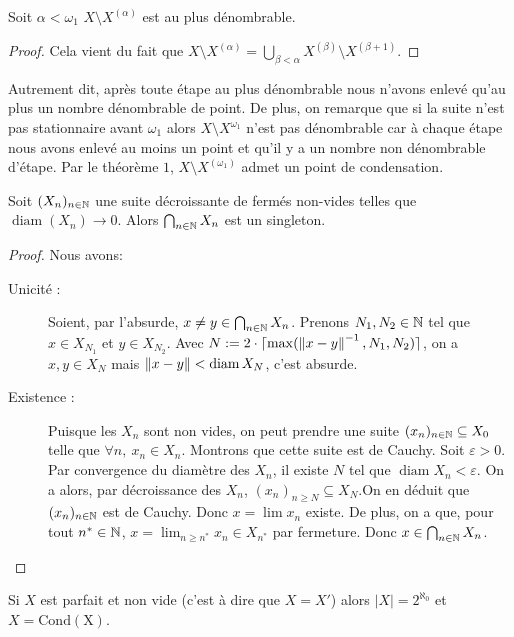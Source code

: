 \begin{lemme}
   Soit $\alpha <\omega_1$ $X\setminus X^{(\alpha)}$ est au plus dénombrable.
\end{lemme}

\begin{proof}
    Cela vient du fait que $X\setminus X^{(\alpha)}= \bigcup_{\beta<\alpha}X^{(\beta)}\setminus X^{(\beta+1)}$.
\end{proof}
Autrement dit, après toute étape au plus dénombrable nous n'avons enlevé qu'au plus un nombre dénombrable de point. De plus, on remarque que si la suite n'est pas stationnaire avant $\omega_1$ alors $X\setminus X^{\omega_1}$ n'est pas dénombrable car à chaque étape nous avons enlevé au moins un point et qu'il y a un nombre non dénombrable d'étape. Par le théorème $1$, $X\setminus X^{(\omega_1)}$ admet un point de condensation.
 \begin{lemme}
        Soit $(X_n)_{n\in\mathbb{N}}$ une suite décroissante de fermés non-vides telles que $\operatorname{diam}(X_n)\to 0$. Alors $\bigcap_{n\in\mathbb{N}} X_n $ est un singleton.
\end{lemme}
\begin{proof}
Nous avons:
\begin{description}
    \item[Unicité : ] Soient, par l'absurde, $x\ne y \in\bigcap_{n\in\mathbb{N}} X_n$. Prenons $N_1,N_2\in\mathbb{N}$ tel que $x\in X_{N_1}$ et $y\in X_{N_2}$. Avec $N:=2\cdot\lceil\max(\left\| x-y \right\|^{-1}, N_1,N_2)\rceil$, on a $x,y\in X_N$ mais $\left\| x-y \right\|<\operatorname{diam} X_N$, c'est absurde. 
    \item[Existence : ] Puisque les $X_n$ sont non vides, on peut prendre une suite $(x_n)_{n\in\mathbb{N}}\subseteq X_0$ telle que $\forall n,\ x_n\in X_n$. Montrons que cette suite est de Cauchy. Soit $\varepsilon>0$. Par convergence du diamètre des $X_n$, il existe $N$ tel que $\operatorname{diam} X_n<\varepsilon$. On a alors, par décroissance des $X_n$, $(x_n)_{n\ge N}\subseteq X_N$.On en déduit que $(x_n)_{n\in\mathbb{N}}$ est de Cauchy.
    Donc $x = \lim x_n$ existe. De plus, on a que, pour tout $n^*\in\mathbb{N}$, $x = \lim_{n\ge n^*} x_n\in X_{n^*}$ par fermeture. Donc $x\in \bigcap_{n\in\mathbb{N}} X_n $.
\end{description}
\end{proof}
\begin{theoreme}
    Si $X$ est parfait et non vide (c'est à dire que $X=X'$) alors $|X|= 2^{\aleph_0}$ et $X= \operatorname{Cond(X)}$.
\end{theoreme}

